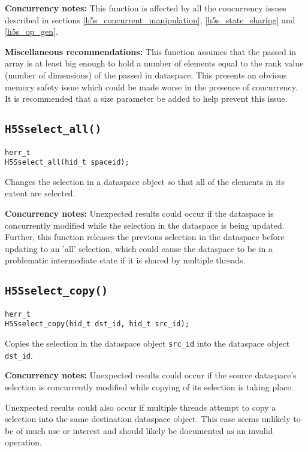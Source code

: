 \documentclass[../HDF5_RFC.tex]{subfiles}
\begin{document}
\textbf{Concurrency notes:} This function is affected by all the concurrency issues described in
sections \ref{h5s_concurrent_manipulation}, \ref{h5s_state_sharing} and \ref{h5s_op_gen}.

\textbf{Miscellaneous recommendations:} This function assumes that the passed in array is
at least big enough to hold a number of elements equal to the rank value (number of
dimensions) of the passed in dataspace. This presents an obvious memory safety issue which
could be made worse in the presence of concurrency. It is recommended that a size parameter
be added to help prevent this issue.

\subsection{\texttt{H5Sselect\_all()}}
\label{apdx:h5s_func_h5sselect_all}

\begin{verbatim}
herr_t
H5Sselect_all(hid_t spaceid);
\end{verbatim}

Changes the selection in a dataspace object so that all of the elements in its extent are selected.

\textbf{Concurrency notes:} Unexpected results could occur if the dataspace is concurrently
modified while the selection in the dataspace is being updated. Further, this function releases
the previous selection in the dataspace before updating to an 'all' selection, which could cause
the dataspace to be in a problematic intermediate state if it is shared by multiple threads.

\subsection{\texttt{H5Sselect\_copy()}}
\label{apdx:h5s_func_h5sselect_copy}

\begin{verbatim}
herr_t
H5Sselect_copy(hid_t dst_id, hid_t src_id);
\end{verbatim}

Copies the selection in the dataspace object \texttt{src\_id} into the dataspace object \texttt{dst\_id}.

\textbf{Concurrency notes:} Unexpected results could occur if the source dataspace's selection is
concurrently modified while copying of its selection is taking place.

Unexpected results could also occur if multiple threads attempt to copy a selection into the
same destination dataspace object. This case seems unlikely to be of much use or interest and
should likely be documented as an invalid operation.
\end{document}
